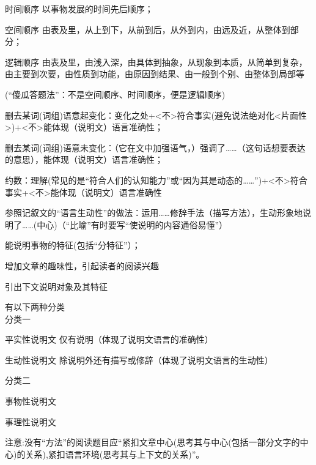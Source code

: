 \begin{compactdesc}
\item[时间顺序]以事物发展的时间先后顺序；
\item[空间顺序]由表及里，从上到下，从前到后，从外到内，由远及近，从整体到部分；
\item[逻辑顺序]由表及里，由浅入深，由具体到抽象，从现象到本质，从简单到复杂，由主要到次要，由性质到功能，由原因到结果、由一般到个别、由整体到局部等
\end{compactdesc}
(``傻瓜答题法''：不是空间顺序、时间顺序，便是逻辑顺序)

\begin{asparaenum}[(1)]
\item 删去某词(词组)语意起变化：变化之处+<不>符合事实(避免说法绝对化<片面性>)+<不>能体现（说明文）语言准确性；
\item 删去某词(词组)语意未变化：（它在文中加强语气，）强调了\ldots{}\ldots{}（这句话想要表达的意思），能体现（说明文）语言准确性；
\item 约数：理解(常见的是``符合人们的认知能力''或``因为其是动态的\ldots{}\ldots{}'')+<不>符合事实+<不>能体现（说明文）语言准确性
\end{asparaenum}
参照记叙文的``语言生动性''的做法：运用\ldots{}\ldots{}修辞手法（描写方法），生动形象地说明了\ldots{}\ldots{}(中心)（``比喻''有时要写``使说明的内容通俗易懂''）
\begin{asparaenum}[(1)]
\item 能说明事物的特征(包括``分特征''）；
\item 增加文章的趣味性，引起读者的阅读兴趣
\item 引出下文说明对象及其特征
\end{asparaenum}

有以下两种分类
\\分类一
\begin{compactdesc}
\item[平实性说明文]仅有说明（体现了说明文语言的准确性）
\item[生动性说明文]除说明外还有描写或修辞（体现了说明文语言的生动性）
\end{compactdesc}
分类二
\begin{compactdesc}
\item[事物性说明文]
\item[事理性说明文]
\end{compactdesc}

注意:没有``方法''的阅读题目应``紧扣文章中心(思考其与中心(包括一部分文字的中心)的关系),紧扣语言环境(思考其与上下文的关系)''。
\label{main}
